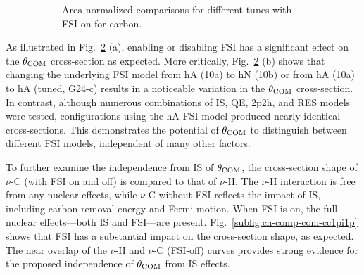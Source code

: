 \begin{figure}[ht!]
\begin{subfigure}[ht!]{\dbfigwid\textwidth}
               \caption{Area normalized comparisons for different tunes with FSI on for carbon. }
               \label{subfig:fsi-comp-gt}
          \end{subfigure}
          \caption{ }
          \label{fig:fsi-comp}
          \end{figure}

          As illustrated in Fig.~\ref{fig:fsi-comp} (a), enabling or disabling FSI has a significant effect on the $\theta_{\textrm{COM}}$ cross-section as expected.
          More critically, Fig.~\ref{fig:fsi-comp} (b) shows that changing the underlying FSI model from hA (10a) to hN (10b) or from hA (10a) to hA (tuned, G24-c) results in a noticeable variation in the $\theta_{\textrm{COM}}$ cross-section. 
          In contrast, although numerous combinations of IS, QE, 2p2h, and RES models were tested, configurations using the hA FSI model produced nearly identical cross-sections.
          This demonstrates the potential of $\theta_{\textrm{COM}}$ to distinguish between different FSI models, independent of many other factors.


          To further examine the independence from IS of $\theta_{\textrm{COM}}$, the cross-section shape of $\nu$-C (with FSI on and off) is compared to that of $\nu$-H. 
          The $\nu$-H interaction is free from any nuclear effects, while $\nu$-C without FSI reflects the impact of IS, including carbon removal energy and Fermi motion. 
          When FSI is on, the full nuclear effects—both IS and FSI—are present. 
          Fig.~\ref{subfig:ch-comp-com-cc1pi1p} shows that FSI has a substantial impact on the cross-section shape, as expected. 
          The near overlap of the $\nu$-H and $\nu$-C (FSI-off) curves provides strong evidence for the proposed independence of $\theta_{\textrm{COM}}$ from IS effects.

